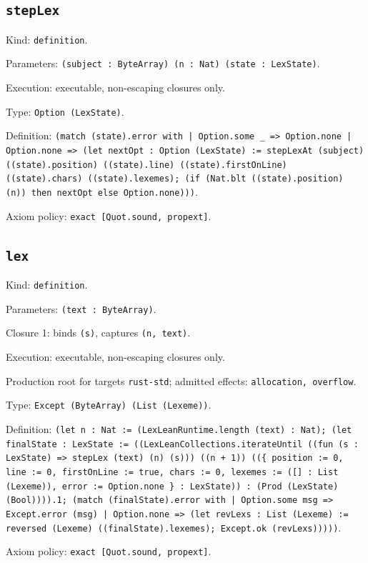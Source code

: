 \documentclass[11pt]{article}
\begin{document}
\subsection*{\texttt{stepLex}}
\noindent Kind: \texttt{definition}.\par
\noindent Parameters: \texttt{(subject : ByteArray) (n : Nat) (state : LexState)}.\par
\noindent Execution: executable, non-escaping closures only.\par
\noindent Type: \texttt{Option (LexState)}.\par
\noindent Definition: \texttt{(match (state).error with | Option.some \_ => Option.none | Option.none => (let nextOpt : Option (LexState) := stepLexAt (subject) ((state).position) ((state).line) ((state).firstOnLine) ((state).chars) ((state).lexemes); (if (Nat.blt ((state).position) (n)) then nextOpt else Option.none)))}.\par
\noindent Axiom policy: \texttt{exact [Quot.sound, propext]}.\par
\subsection*{\texttt{lex}}
\noindent Kind: \texttt{definition}.\par
\noindent Parameters: \texttt{(text : ByteArray)}.\par
\noindent Closure 1: binds \texttt{(s)}, captures \texttt{(n, text)}.\par
\noindent Execution: executable, non-escaping closures only.\par
\noindent Production root for targets \texttt{rust-std}; admitted effects: \texttt{allocation, overflow}.\par
\noindent Type: \texttt{Except (ByteArray) (List (Lexeme))}.\par
\noindent Definition: \texttt{(let n : Nat := (LexLeanRuntime.length (text) : Nat); (let finalState : LexState := ((LexLeanCollections.iterateUntil ((fun (s : LexState) => stepLex (text) (n) (s))) ((n + 1)) ((\{ position := 0, line := 0, firstOnLine := true, chars := 0, lexemes := ([] : List (Lexeme)), error := Option.none \} : LexState)) : (Prod (LexState) (Bool)))).1; (match (finalState).error with | Option.some msg => Except.error (msg) | Option.none => (let revLexs : List (Lexeme) := reversed (Lexeme) ((finalState).lexemes); Except.ok (revLexs)))))}.\par
\noindent Axiom policy: \texttt{exact [Quot.sound, propext]}.\par
\end{document}
